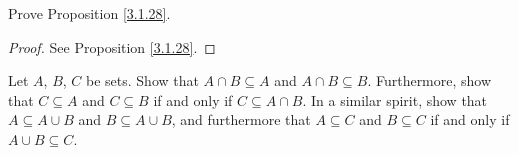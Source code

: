 \begin{exercise}\label{ex 3.1.6}
Prove Proposition \ref{3.1.28}.
\end{exercise}

\begin{proof}
See Proposition \ref{3.1.28}.
\end{proof}

\begin{exercise}\label{ex 3.1.7}
Let \(A\), \(B\), \(C\) be sets.
Show that \(A \cap B \subseteq A\) and \(A \cap B \subseteq B\).
Furthermore, show that \(C \subseteq A\) and \(C \subseteq B\) if and only if \(C \subseteq A \cap B\).
In a similar spirit, show that \(A \subseteq A \cup B\) and \(B \subseteq A \cup B\), and furthermore that \(A \subseteq C\) and \(B \subseteq C\) if and only if \(A \cup B \subseteq C\).
\end{exercise}

